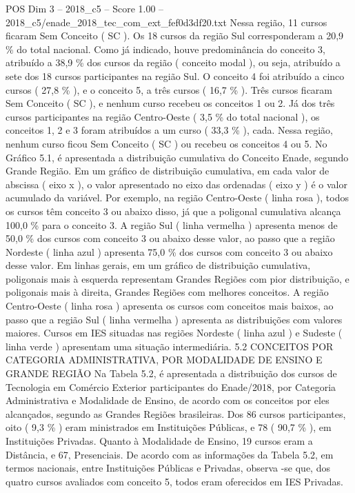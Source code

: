\begin{textsample}{POS Dim 3 – 2018\_c5 – Score 1.00 – 2018\_c5/enade\_2018\_tec\_com\_ext\_fef0d3df20.txt}
Nessa região, 11 cursos ficaram Sem Conceito ( SC ).
Os 18 cursos da região Sul corresponderam a 20,9 \% do total nacional.
Como já indicado, houve predominância do conceito 3, atribuído a 38,9 \% dos cursos da região ( conceito modal ), ou seja, atribuído a sete dos 18 cursos participantes na região Sul.
O conceito 4 foi atribuído a cinco cursos ( 27,8 \% ), e o conceito 5, a três cursos ( 16,7 \% ).
Três cursos ficaram Sem Conceito ( SC ), e nenhum curso recebeu os conceitos 1 ou 2.
Já dos três cursos participantes na região Centro-Oeste ( 3,5 \% do total nacional ), os conceitos 1, 2 e 3 foram atribuídos a um curso ( 33,3 \% ), cada.
Nessa região, nenhum curso ficou Sem Conceito ( SC ) ou recebeu os conceitos 4 ou 5.
No Gráfico 5.1, é apresentada a distribuição cumulativa do Conceito Enade, segundo Grande Região.
Em um gráfico de distribuição cumulativa, em cada valor de abscissa ( eixo x ), o valor apresentado no eixo das ordenadas ( eixo y ) é o valor acumulado da variável.
Por exemplo, na região Centro-Oeste ( linha rosa ), todos os cursos têm conceito 3 ou abaixo disso, já que a poligonal cumulativa alcança 100,0 \% para o conceito 3.
A região Sul ( linha vermelha ) apresenta menos de 50,0 \% dos cursos com conceito 3 ou abaixo desse valor, ao passo que a região Nordeste ( linha azul ) apresenta 75,0 \% dos cursos com conceito 3 ou abaixo desse valor.
Em linhas gerais, em um gráfico de distribuição cumulativa, poligonais mais à esquerda representam Grandes Regiões com pior distribuição, e poligonais mais à direita, Grandes Regiões com melhores conceitos.
A região Centro-Oeste ( linha rosa ) apresenta os cursos com conceitos mais baixos, ao passo que a região Sul ( linha vermelha ) apresenta as distribuições com valores maiores.
Cursos em IES situadas nas regiões Nordeste ( linha azul ) e Sudeste ( linha verde ) apresentam uma situação intermediária. 5.2 CONCEITOS POR CATEGORIA ADMINISTRATIVA, POR MODALIDADE DE ENSINO E GRANDE REGIÃO Na Tabela 5.2, é apresentada a distribuição dos cursos de Tecnologia em Comércio Exterior participantes do Enade/2018, por Categoria Administrativa e Modalidade de Ensino, de acordo com os conceitos por eles alcançados, segundo as Grandes Regiões brasileiras.
Dos 86 cursos participantes, oito ( 9,3 \% ) eram ministrados em Instituições Públicas, e 78 ( 90,7 \% ), em Instituições Privadas.
Quanto à Modalidade de Ensino, 19 cursos eram a Distância, e 67, Presenciais.
De acordo com as informações da Tabela 5.2, em termos nacionais, entre Instituições Públicas e Privadas, observa -se que, dos quatro cursos avaliados com conceito 5, todos eram oferecidos em IES Privadas.

\end{textsample}

